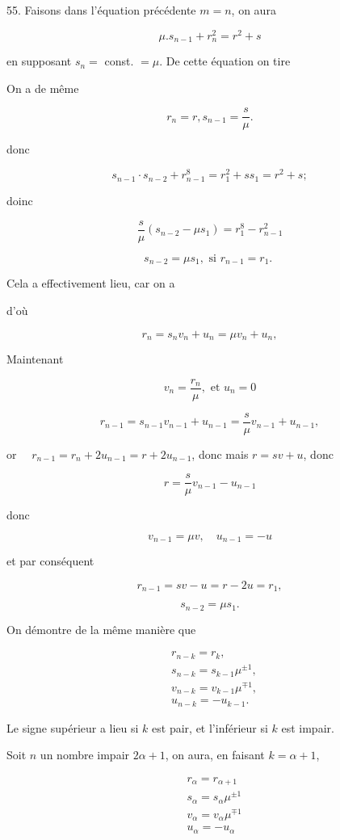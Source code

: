 \documentclass{article}
\begin{document}
55. Faisons dans l'équation précédente \(m=n\), on aura

\[
\mu . s_{n-1}+r_{n}^{2}=r^{2}+s
\]

en supposant \(s_{n}=\) const. \(=\mu\). De cette équation on tire

On a de même

\[
r_{n}=r, s_{n-1}=\frac{s}{\mu} .
\]

donc

\[
s_{n-1} \cdot s_{n-2}+r_{n-1}^{8}=r_{1}^{2}+s s_{1}=r^{2}+s ;
\]

doinc

\[
\frac{s}{\mu}\left(s_{n-2}-\mu s_{1}\right)=r_{1}^{8}-r_{n-1}^{2}
\]

\[
s_{n-2}=\mu s_{1}, \text { si } r_{n-1}=r_{1} \text {. }
\]

Cela a effectivement lieu, car on a

d'où

\[
r_{n}=s_{n} v_{n}+u_{n}=\mu v_{n}+u_{n},
\]

Maintenant

\[
v_{n}=\frac{r_{n}}{\mu}, \text { et } u_{n}=0
\]

\[
r_{n-1}=s_{n-1} v_{n-1}+u_{n-1}=\frac{s}{\mu} v_{n-1}+u_{n-1},
\]

or \(\quad r_{n-1}=r_{n}+2 u_{n-1}=r+2 u_{n-1}\), donc
mais \(r=s v+u\), donc

\[
r=\frac{s}{\mu} v_{n-1}-u_{n-1}
\]

donc

\[
v_{n-1}=\mu v, \quad u_{n-1}=-u
\]

et par conséquent

\[
r_{n-1}=s v-u=r-2 u=r_{1},
\]

\[
s_{n-2}=\mu s_{1} .
\]

On démontre de la même manière que

\[
\begin{aligned}
& r_{n-k}=r_{k}, \\
& s_{n-k}=s_{k-1} \mu^{ \pm 1}, \\
& v_{n-k}=v_{k-1} \mu^{\mp 1}, \\
& u_{n-k}=-u_{k-1} .
\end{aligned}
\]

Le signe supérieur a lieu si \(k\) est pair, et l'inférieur si \(k\) est impair.

Soit \(n\) un nombre impair \(2 \alpha+1\), on aura, en faisant \(k=\alpha+1\),

\[
\begin{aligned}
& r_{\alpha}=r_{\alpha+1} \\
& s_{\alpha}=s_{\alpha} \mu^{ \pm 1} \\
& v_{\alpha}=v_{\alpha} \mu^{\mp 1} \\
& u_{\alpha}=-u_{\alpha}
\end{aligned}
\]
\end{document}
